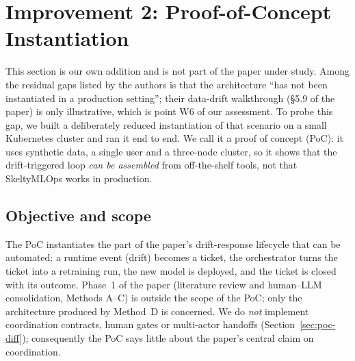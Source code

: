 %

\section{Improvement 2: Proof-of-Concept Instantiation}
\label{sec:poc}

This section is our own addition and is not part of the paper under study.
Among the residual gaps listed by the authors is that the architecture ``has not been instantiated in a production setting''; their data-drift walkthrough (\S5.9 of the paper) is only illustrative, which is point W6 of our assessment.
To probe this gap, we built a deliberately reduced instantiation of that scenario on a small Kubernetes cluster and ran it end to end.
We call it a proof of concept (PoC): it uses synthetic data, a single user and a three-node cluster, so it shows that the drift-triggered loop \emph{can be assembled} from off-the-shelf tools, not that SkeltyMLOps works in production.

\subsection{Objective and scope}

The PoC instantiates the part of the paper's drift-response lifecycle that can be automated: a runtime event (drift) becomes a ticket, the orchestrator turns the ticket into a retraining run, the new model is deployed, and the ticket is closed with its outcome.
Phase~1 of the paper (literature review and human--LLM consolidation, Methods A--C) is outside the scope of the PoC; only the architecture produced by Method~D is concerned.
We do \emph{not} implement coordination contracts, human gates or multi-actor handoffs (Section~\ref{sec:poc-diff}); consequently the PoC says little about the paper's central claim on coordination.

